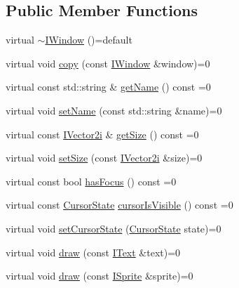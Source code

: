 \subsection*{Public Member Functions}
\begin{DoxyCompactItemize}
\item 
virtual \mbox{\hyperlink{classarcade_1_1graphic_1_1_i_window_a444d8868d9aad4ee0d1a67433a30ffba}{$\sim$\+I\+Window}} ()=default
\item 
virtual void \mbox{\hyperlink{classarcade_1_1graphic_1_1_i_window_a151e3e7a42b7635ccfb5b0de903bffa8}{copy}} (const \mbox{\hyperlink{classarcade_1_1graphic_1_1_i_window}{I\+Window}} \&window)=0
\item 
virtual const std\+::string \& \mbox{\hyperlink{classarcade_1_1graphic_1_1_i_window_aaf984acf6c057878bc1c24134b897459}{get\+Name}} () const =0
\item 
virtual void \mbox{\hyperlink{classarcade_1_1graphic_1_1_i_window_ad9f161f552c15d131661103567b9c9c3}{set\+Name}} (const std\+::string \&name)=0
\item 
virtual const \mbox{\hyperlink{classarcade_1_1graphic_1_1_i_vector2i}{I\+Vector2i}} \& \mbox{\hyperlink{classarcade_1_1graphic_1_1_i_window_afe84df5e5cc47ba9d9e277d62f292684}{get\+Size}} () const =0
\item 
virtual void \mbox{\hyperlink{classarcade_1_1graphic_1_1_i_window_a4c6258e5dfaf0eb23304ba290d51f750}{set\+Size}} (const \mbox{\hyperlink{classarcade_1_1graphic_1_1_i_vector2i}{I\+Vector2i}} \&size)=0
\item 
virtual const bool \mbox{\hyperlink{classarcade_1_1graphic_1_1_i_window_a84eaf98ba609609b445b80618f37b8eb}{has\+Focus}} () const =0
\item 
virtual const \mbox{\hyperlink{classarcade_1_1graphic_1_1_i_window_aa88d1788d30d459f166dd29dbe5b5f7f}{Cursor\+State}} \mbox{\hyperlink{classarcade_1_1graphic_1_1_i_window_aed6a4805e9b3ed9cdb42008a4e767778}{cursor\+Is\+Visible}} () const =0
\item 
virtual void \mbox{\hyperlink{classarcade_1_1graphic_1_1_i_window_a3191f74f851804b1007f008276ba38b9}{set\+Cursor\+State}} (\mbox{\hyperlink{classarcade_1_1graphic_1_1_i_window_aa88d1788d30d459f166dd29dbe5b5f7f}{Cursor\+State}} state)=0
\item 
virtual void \mbox{\hyperlink{classarcade_1_1graphic_1_1_i_window_a11f9f08e00f3393afda503614c0246e0}{draw}} (const \mbox{\hyperlink{classarcade_1_1graphic_1_1_i_text}{I\+Text}} \&text)=0
\item 
virtual void \mbox{\hyperlink{classarcade_1_1graphic_1_1_i_window_a13085d82338bc91f9ac24b6430e373e4}{draw}} (const \mbox{\hyperlink{classarcade_1_1graphic_1_1_i_sprite}{I\+Sprite}} \&sprite)=0
\end{DoxyCompactItemize}


